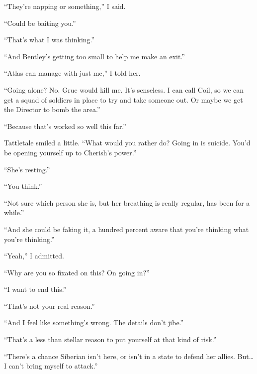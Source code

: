 ``They're napping or something,'' I said.



``Could be baiting you.''



``That's what I was thinking.''



``And Bentley's getting too small to help me make an exit.''



``Atlas can manage with just me,'' I told her.



``Going alone?  No.  Grue would kill me.  It's senseless.  I can call Coil, so we can get a squad of soldiers in place to try and take someone out.  Or maybe we get the Director to bomb the area.''



``Because that's worked so well this far.''



Tattletale smiled a little.  ``What would you rather do?  Going in is suicide.  You'd be opening yourself up to Cherish's power.''



``She's resting.''



``You think.''



``Not sure which person she is, but her breathing is really regular, has been for a while.''



``And she could be faking it, a hundred percent aware that you're thinking what you're thinking.''



``Yeah,'' I admitted.



``Why are you so fixated on this?  On going in?''



``I want to end this.''



``That's not your real reason.''



``And I feel like something's wrong.  The details don't jibe.''



``That's a less than stellar reason to put yourself at that kind of risk.''



``There's a chance Siberian isn't here, or isn't in a state to defend her allies.  But\ldots I can't bring myself to attack.''



